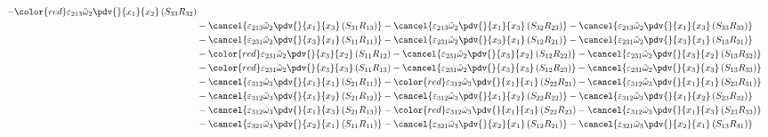\begin{equation}
\begin{split}
		-{\color{red}\varepsilon_{213}\tilde{\omega}_{2}\pdv{}{x_{1}}{x_{2}}\left(S_{33}R_{32}\right)}\\
&		-\cancel{\varepsilon_{213}\tilde{\omega}_{2}\pdv{}{x_{1}}{x_{3}}\left(S_{31}R_{13}\right)}
		-\cancel{\varepsilon_{213}\tilde{\omega}_{2}\pdv{}{x_{1}}{x_{3}}\left(S_{32}R_{23}\right)}
		-\cancel{\varepsilon_{213}\tilde{\omega}_{2}\pdv{}{x_{1}}{x_{3}}\left(S_{33}R_{33}\right)}\\
&		-\cancel{\varepsilon_{231}\tilde{\omega}_{2}\pdv{}{x_{3}}{x_{1}}\left(S_{11}R_{11}\right)}
		-\cancel{\varepsilon_{231}\tilde{\omega}_{2}\pdv{}{x_{3}}{x_{1}}\left(S_{12}R_{21}\right)}
		-\cancel{\varepsilon_{231}\tilde{\omega}_{2}\pdv{}{x_{3}}{x_{1}}\left(S_{13}R_{31}\right)}\\
&		-{\color{red}\varepsilon_{231}\tilde{\omega}_{2}\pdv{}{x_{3}}{x_{2}}\left(S_{11}R_{12}\right)}
		-\cancel{\varepsilon_{231}\tilde{\omega}_{2}\pdv{}{x_{3}}{x_{2}}\left(S_{12}R_{22}\right)}
		-\cancel{\varepsilon_{231}\tilde{\omega}_{2}\pdv{}{x_{3}}{x_{2}}\left(S_{13}R_{32}\right)}\\
&		-{\color{red}\varepsilon_{231}\tilde{\omega}_{2}\pdv{}{x_{3}}{x_{3}}\left(S_{11}R_{13}\right)}
		-\cancel{\varepsilon_{231}\tilde{\omega}_{2}\pdv{}{x_{3}}{x_{3}}\left(S_{12}R_{23}\right)}
		-\cancel{\varepsilon_{231}\tilde{\omega}_{2}\pdv{}{x_{3}}{x_{3}}\left(S_{13}R_{33}\right)}\\
&		-\cancel{\varepsilon_{312}\tilde{\omega}_{3}\pdv{}{x_{1}}{x_{1}}\left(S_{21}R_{11}\right)}
		-{\color{red}\varepsilon_{312}\tilde{\omega}_{3}\pdv{}{x_{1}}{x_{1}}\left(S_{22}R_{21}\right)}
		-\cancel{\varepsilon_{312}\tilde{\omega}_{3}\pdv{}{x_{1}}{x_{1}}\left(S_{23}R_{31}\right)}\\
&		-\cancel{\varepsilon_{312}\tilde{\omega}_{3}\pdv{}{x_{1}}{x_{2}}\left(S_{21}R_{12}\right)}
		-\cancel{\varepsilon_{312}\tilde{\omega}_{3}\pdv{}{x_{1}}{x_{2}}\left(S_{22}R_{22}\right)}
		-\cancel{\varepsilon_{312}\tilde{\omega}_{3}\pdv{}{x_{1}}{x_{2}}\left(S_{23}R_{32}\right)}\\
&		-\cancel{\varepsilon_{312}\tilde{\omega}_{3}\pdv{}{x_{1}}{x_{3}}\left(S_{21}R_{13}\right)}
		-{\color{red}\varepsilon_{312}\tilde{\omega}_{3}\pdv{}{x_{1}}{x_{3}}\left(S_{22}R_{23}\right)}
		-\cancel{\varepsilon_{312}\tilde{\omega}_{3}\pdv{}{x_{1}}{x_{3}}\left(S_{23}R_{33}\right)}\\
&		-\cancel{\varepsilon_{321}\tilde{\omega}_{3}\pdv{}{x_{2}}{x_{1}}\left(S_{11}R_{11}\right)}
		-\cancel{\varepsilon_{321}\tilde{\omega}_{3}\pdv{}{x_{2}}{x_{1}}\left(S_{12}R_{21}\right)}
		-\cancel{\varepsilon_{321}\tilde{\omega}_{3}\pdv{}{x_{2}}{x_{1}}\left(S_{13}R_{31}\right)}\\

\end{split}
\end{equation}
